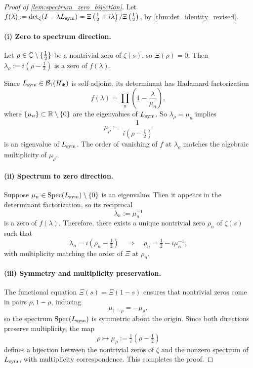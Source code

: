 \begin{proof}[Proof of \cref{lem:spectrum_zero_bijection}]
Let \( f(\lambda) := \det\nolimits_\zeta(I - \lambda L_{\mathrm{sym}}) = \Xi\left(\tfrac{1}{2} + i\lambda\right) / \Xi\left(\tfrac{1}{2}\right) \), by \cref{thm:det_identity_revised}.

\paragraph{(i) Zero to spectrum direction.}
Let \( \rho \in \mathbb{C} \setminus \{\tfrac{1}{2}\} \) be a nontrivial zero of \( \zeta(s) \), so \( \Xi(\rho) = 0 \). Then \( \lambda_\rho := i(\rho - \tfrac{1}{2}) \) is a zero of \( f(\lambda) \).

Since \( L_{\mathrm{sym}} \in \mathcal{B}_1(H_{\Psi}) \) is self-adjoint, its determinant has Hadamard factorization
\[
f(\lambda) = \prod_n \left(1 - \frac{\lambda}{\mu_n}\right),
\]
where \( \{\mu_n\} \subset \mathbb{R} \setminus \{0\} \) are the eigenvalues of \( L_{\mathrm{sym}} \). So \( \lambda_\rho = \mu_n \) implies
\[
\mu_\rho := \frac{1}{i(\rho - \tfrac{1}{2})}
\]
is an eigenvalue of \( L_{\mathrm{sym}} \). The order of vanishing of \( f \) at \( \lambda_\rho \) matches the algebraic multiplicity of \( \mu_\rho \).

\paragraph{(ii) Spectrum to zero direction.}
Suppose \( \mu_n \in \operatorname{Spec}(L_{\mathrm{sym}}) \setminus \{0\} \) is an eigenvalue. Then it appears in the determinant factorization, so its reciprocal
\[
\lambda_n := \mu_n^{-1}
\]
is a zero of \( f(\lambda) \). Therefore, there exists a unique nontrivial zero \( \rho_n \) of \( \zeta(s) \) such that
\[
\lambda_n = i(\rho_n - \tfrac{1}{2}) \quad \Rightarrow \quad \rho_n = \tfrac{1}{2} - i\mu_n^{-1},
\]
with multiplicity matching the order of \( \Xi \) at \( \rho_n \).

\paragraph{(iii) Symmetry and multiplicity preservation.}
The functional equation \( \Xi(s) = \Xi(1 - s) \) ensures that nontrivial zeros come in pairs \( \rho, 1 - \rho \), inducing
\[
\mu_{1 - \rho} = -\mu_\rho,
\]
so the spectrum \( \operatorname{Spec}(L_{\mathrm{sym}}) \) is symmetric about the origin. Since both directions preserve multiplicity, the map
\[
\rho \mapsto \mu_\rho := \tfrac{1}{i}(\rho - \tfrac{1}{2})
\]
defines a bijection between the nontrivial zeros of \( \zeta \) and the nonzero spectrum of \( L_{\mathrm{sym}} \), with multiplicity correspondence. This completes the proof.
\end{proof}
